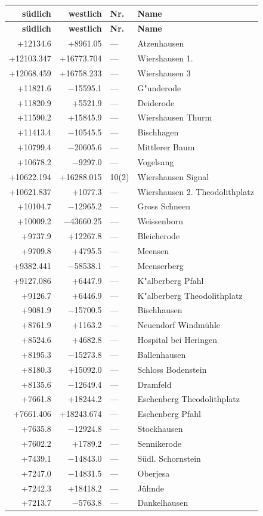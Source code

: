 \documentclass[12pt,a4paper]{article}
\begin{document}
\begin{longtable}{r r l p{6cm}}
\toprule
\textbf{s\"udlich} & \textbf{westlich} & \textbf{Nr.} & \textbf{Name} \\
\midrule
\endfirsthead
\toprule
\textbf{s\"udlich} & \textbf{westlich} & \textbf{Nr.} & \textbf{Name} \\
\midrule
\endhead
\bottomrule
\endfoot
+12134.6 & +8961.05 & --- & Atzenhausen \\
+12103.347 & +16773.704 & --- & Wiershausen 1. \\
+12068.459 & +16758.233 & --- & Wiershausen 3 \\
+11821.6 & $-$15595.1 & --- & G{"u}nderode \\
+11820.9 & +5521.9 & --- & Deiderode \\
+11590.2 & +15845.9 & --- & Wiershausen Thurm \\
+11413.4 & $-$10545.5 & --- & Bischhagen \\
+10799.4 & $-$20605.6 & --- & Mittlerer Baum \\
+10678.2 & $-$9297.0 & --- & Vogelsang \\
+10622.194 & +16288.015 & 10(2) & Wiershausen Signal \\
+10621.837 & +1077.3 & --- & Wiershausen 2. Theodolithplatz \\
+10104.7 & $-$12965.2 & --- & Gross Schneen \\
+10009.2 & $-$43660.25 & --- & Weissenborn \\
+9737.9 & +12267.8 & --- & Bleicherode \\
+9709.8 & +4795.5 & --- & Meensen \\
+9382.441 & $-$58538.1 & --- & Meenserberg \\
+9127.086 & +6447.9 & --- & K{"a}lberberg Pfahl \\
+9126.7 & +6446.9 & --- & K{"a}lberberg Theodolithplatz \\
+9081.9 & $-$15700.5 & --- & Bischhausen \\
+8761.9 & +1163.2 & --- & Neuendorf Windm\"uhle \\
+8524.6 & +4682.8 & --- & Hospital bei Heringen \\
+8195.3 & $-$15273.8 & --- & Ballenhausen \\
+8180.3 & +15092.0 & --- & Schloss Bodenstein \\
+8135.6 & $-$12649.4 & --- & Dramfeld \\
+7661.8 & +18244.2 & --- & Eschenberg Theodolithplatz \\
+7661.406 & +18243.674 & --- & Eschenberg Pfahl \\
+7635.8 & $-$12924.8 & --- & Stockhausen \\
+7602.2 & +1789.2 & --- & Sennikerode \\
+7439.1 & $-$14843.0 & --- & S\"udl. Schornstein \\
+7247.0 & $-$14831.5 & --- & Oberjesa \\
+7242.3 & +18418.2 & --- & J\"uhnde \\
+7213.7 & $-$5763.8 & --- & Dankelhausen \\
\end{longtable}
\end{document}
